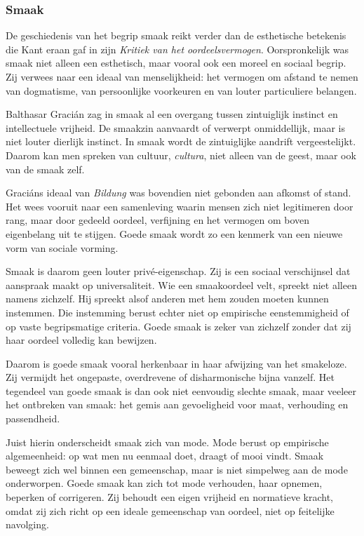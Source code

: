 \documentclass[11pt,twoside,openright]{memoir}
\begin{document}
\subsubsection{Smaak}

De geschiedenis van het begrip smaak reikt verder dan de esthetische betekenis die Kant eraan gaf in zijn \textit{Kritiek van het oordeelsvermogen}. Oorspronkelijk was smaak niet alleen een esthetisch, maar vooral ook een moreel en sociaal begrip. Zij verwees naar een ideaal van menselijkheid: het vermogen om afstand te nemen van dogmatisme, van persoonlijke voorkeuren en van louter particuliere belangen.

Balthasar Gracián zag in smaak al een overgang tussen zintuiglijk instinct en intellectuele vrijheid. De smaakzin aanvaardt of verwerpt onmiddellijk, maar is niet louter dierlijk instinct. In smaak wordt de zintuiglijke aandrift vergeestelijkt. Daarom kan men spreken van cultuur, \textit{cultura}, niet alleen van de geest, maar ook van de smaak zelf.

Graciáns ideaal van \textit{Bildung} was bovendien niet gebonden aan afkomst of stand. Het wees vooruit naar een samenleving waarin mensen zich niet legitimeren door rang, maar door gedeeld oordeel, verfijning en het vermogen om boven eigenbelang uit te stijgen. Goede smaak wordt zo een kenmerk van een nieuwe vorm van sociale vorming.

Smaak is daarom geen louter privé-eigenschap. Zij is een sociaal verschijnsel dat aanspraak maakt op universaliteit. Wie een smaakoordeel velt, spreekt niet alleen namens zichzelf. Hij spreekt alsof anderen met hem zouden moeten kunnen instemmen. Die instemming berust echter niet op empirische eenstemmigheid of op vaste begripsmatige criteria. Goede smaak is zeker van zichzelf zonder dat zij haar oordeel volledig kan bewijzen.

Daarom is goede smaak vooral herkenbaar in haar afwijzing van het smakeloze. Zij vermijdt het ongepaste, overdrevene of disharmonische bijna vanzelf. Het tegendeel van goede smaak is dan ook niet eenvoudig slechte smaak, maar veeleer het ontbreken van smaak: het gemis aan gevoeligheid voor maat, verhouding en passendheid.

Juist hierin onderscheidt smaak zich van mode. Mode berust op empirische algemeenheid: op wat men nu eenmaal doet, draagt of mooi vindt. Smaak beweegt zich wel binnen een gemeenschap, maar is niet simpelweg aan de mode onderworpen. Goede smaak kan zich tot mode verhouden, haar opnemen, beperken of corrigeren. Zij behoudt een eigen vrijheid en normatieve kracht, omdat zij zich richt op een ideale gemeenschap van oordeel, niet op feitelijke navolging.
\end{document}
